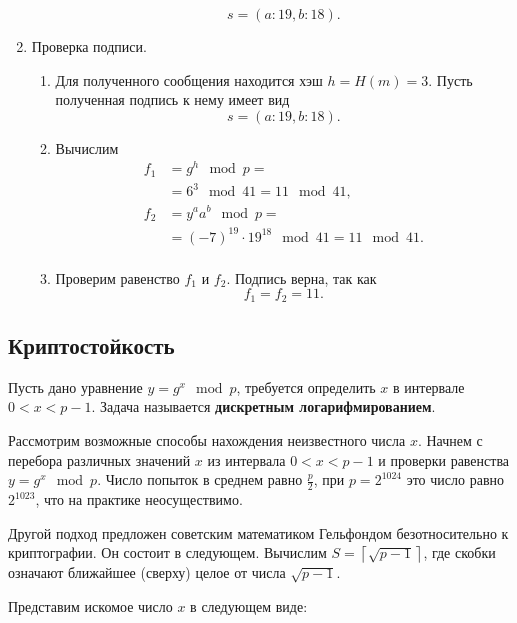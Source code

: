 \begin{enumerate}
\begin{enumerate}
                \[ s = (a:19, b:18). \]
        \end{enumerate}
    \item Проверка подписи.
        \begin{enumerate}
            \item Для полученного сообщения находится хэш $h = H(m) = 3$. Пусть полученная подпись к нему имеет вид
                \[ s = (a:19, b:18). \]
            \item Вычислим
                \[ \begin{array}{ll}
                    f_1 & = g^h \mod p = \\
                        & = 6^3 \mod 41 = 11 \mod 41, \\
                    f_2 & = y^a a^b \mod p = \\
                        & = (-7)^{19} \cdot 19^{18} \mod 41 = 11 \mod 41. \\
                \end{array} \]
            \item Проверим равенство $f_1$ и $f_2$. Подпись верна, так как
                \[ f_1 = f_2 = 11. \]
        \end{enumerate}
\end{enumerate}

\exampleend
{}

\subsection{Криптостойкость}

Пусть дано уравнение $y=g^{x} \mod p$, требуется определить $x$ в интервале $0 < x < p-1$. Задача называется \textbf{дискретным логарифмированием}.

Рассмотрим возможные способы нахождения неизвестного числа $x$. Начнем с перебора различных значений $x$ из интервала $0<x<p-1$ и проверки равенства $y=g^{x} \mod p$. Число попыток в среднем равно $\frac{p}{2}$, при $p=2^{1024}$ это число равно $2^{1023}$, что на практике неосуществимо.

Другой подход предложен советским математиком Гельфондом безотносительно к криптографии. Он состоит в следующем.
Вычислим $S=\left\lceil\sqrt{p-1}\right\rceil $, где скобки означают ближайшее (сверху) целое от числа $\sqrt{p-1} $.

Представим искомое число $x$ в следующем виде:

